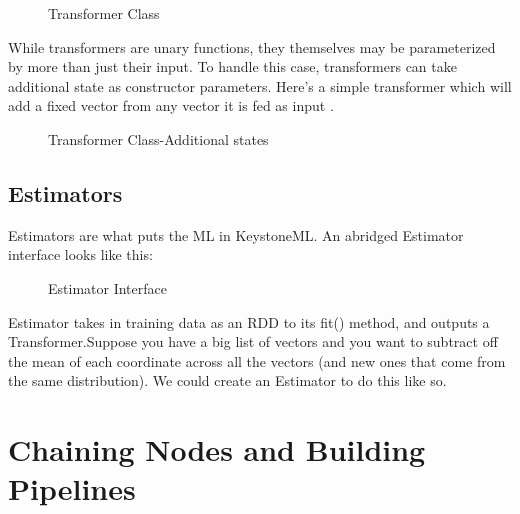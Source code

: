 \documentclass[9pt,twocolumn,twoside]{../../styles/osajnl}
\begin{document}
\begin{figure}[htbp]
\centering
{}
\caption{Transformer Class}
\label{fig:Transformer Class}
\end{figure}

While transformers are unary functions, they themselves may be
parameterized by more than just their input. To handle this case,
transformers can take additional state as constructor
parameters. Here’s a simple transformer which will add a fixed vector
from any vector it is fed as input \cite{www-keystoneml1} .

\begin{figure}[htbp]
\centering
{}
\caption{Transformer Class-Additional states}
\label{fig:Transformer Class-Additional states}
\end{figure}

\subsection{Estimators}

Estimators are what puts the ML in KeystoneML. An abridged Estimator
interface looks like this:

\begin{figure}[htbp]
\centering
{}
\caption{Estimator Interface}
\label{fig:Estimator Interface}
\end{figure}

Estimator takes in training data as an RDD to its fit() method, and
outputs a Transformer.Suppose you have a big list of vectors and you
want to subtract off the mean of each coordinate across all the
vectors (and new ones that come from the same distribution). We could
create an Estimator to do this like so.

\section{Chaining Nodes and Building Pipelines}
\end{document}
